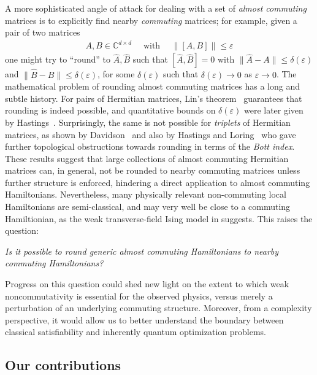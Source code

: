 \documentclass[11pt]{article}
\theoremstyle{plain}
\newcommand{\eps}{\varepsilon}
\begin{document}
A more sophisticated angle of attack for dealing with a set of \emph{almost commuting} matrices is to explicitly find nearby \emph{commuting} matrices; for example, given a pair of two matrices
\begin{align}
A,B \in \mathbb{C}^{d \times d}\quad \text{ with } \quad \|[A,B]\| \leq \eps    
\end{align}
one might try to ``round'' to $\hat{A},\hat{B}$ such that $[\hat A,\hat B]=0$ with $\|\hat A-A\| \leq \delta(\eps)$ and
$\|\hat B-B\| \leq \delta(\eps)$, for some $\delta(\eps)$ such that $\delta(\eps) \rightarrow 0$ as $\eps \rightarrow 0$.
The mathematical problem of rounding almost commuting matrices has a long and subtle history.  For pairs of 
Hermitian matrices, Lin's theorem~\cite{Lin1997} guarantees that rounding is indeed possible, and
quantitative bounds on $\delta(\eps)$ were later given by Hastings~\cite{Hastings_2009,herrera2022hastingsapproachlinstheorem}.  
Surprisingly, the same is not possible for \emph{triplets} of Hermitian matrices, as shown by Davidson~\cite{Davidson1985} and also by 
Hastings and Loring~\cite{Hastings_2010} who gave further topological obstructions towards rounding in terms of the \emph{Bott index}. These results suggest that large collections of almost commuting Hermitian matrices can, in general, not be rounded to nearby commuting matrices unless further structure is enforced, hindering a direct application to almost commuting Hamiltonians. Nevertheless, many physically relevant non-commuting local Hamiltonians are semi-classical, and may very well be close to a commuting Hamiltionian, as the weak transverse-field Ising model in  suggests. This raises the question:
\begin{center}
\emph{Is it possible to round generic almost commuting Hamiltonians
to nearby commuting Hamiltonians?}
\end{center}



Progress on this question could shed new light on the extent to which weak noncommutativity is essential for the observed physics, versus merely a perturbation of an underlying commuting structure. Moreover, from a complexity perspective, it would allow us to better understand the boundary between classical satisfiability and inherently quantum optimization problems.



\subsection{Our contributions}
\end{document}
